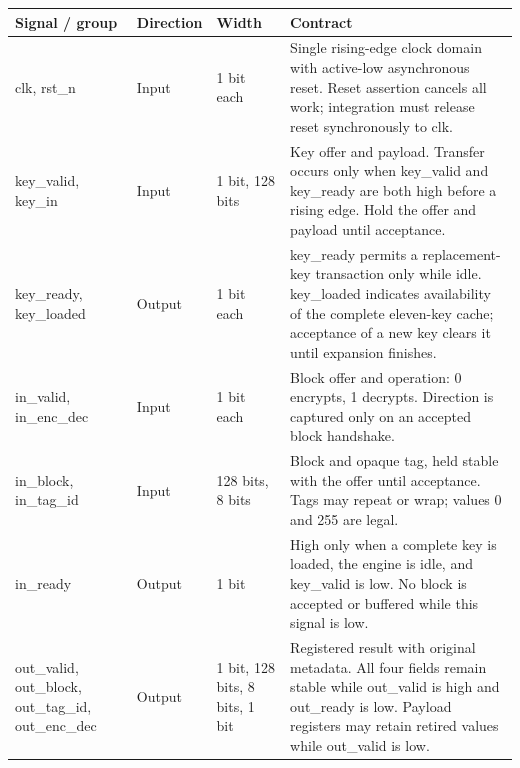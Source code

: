 \documentclass[11pt,a4paper]{article}
\begin{document}
{\small\renewcommand{\arraystretch}{1.18}\begin{longtable}{@{}L{0.21\textwidth}|L{0.12\textwidth}|L{0.12\textwidth}|L{0.45\textwidth}@{}}\toprule

\textbf{Signal /\allowbreak{} group} & \textbf{Direction} & \textbf{Width} & \textbf{Contract}\\\midrule\endhead

clk,\allowbreak{} rst\_\allowbreak{}n & Input & 1 bit each & Single rising-edge clock domain with active-low asynchronous reset. Reset assertion cancels all work; integration must release reset synchronously to clk.\\[2pt]\hline

key\_\allowbreak{}valid,\allowbreak{} key\_\allowbreak{}in & Input & 1 bit,\allowbreak{} 128 bits & Key offer and payload. Transfer occurs only when key\_\allowbreak{}valid and key\_\allowbreak{}ready are both high before a rising edge. Hold the offer and payload until acceptance.\\[2pt]\hline

key\_\allowbreak{}ready,\allowbreak{} key\_\allowbreak{}loaded & Output & 1 bit each & key\_\allowbreak{}ready permits a replacement-key transaction only while idle. key\_\allowbreak{}loaded indicates availability of the complete eleven-key cache; acceptance of a new key clears it until expansion finishes.\\[2pt]\hline

in\_\allowbreak{}valid,\allowbreak{} in\_\allowbreak{}enc\_\allowbreak{}dec & Input & 1 bit each & Block offer and operation: 0 encrypts,\allowbreak{} 1 decrypts. Direction is captured only on an accepted block handshake.\\[2pt]\hline

in\_\allowbreak{}block,\allowbreak{} in\_\allowbreak{}tag\_\allowbreak{}id & Input & 128 bits,\allowbreak{} 8 bits & Block and opaque tag,\allowbreak{} held stable with the offer until acceptance. Tags may repeat or wrap; values 0 and 255 are legal.\\[2pt]\hline

in\_\allowbreak{}ready & Output & 1 bit & High only when a complete key is loaded,\allowbreak{} the engine is idle,\allowbreak{} and key\_\allowbreak{}valid is low. No block is accepted or buffered while this signal is low.\\[2pt]\hline

out\_\allowbreak{}valid,\allowbreak{} out\_\allowbreak{}block,\allowbreak{} out\_\allowbreak{}tag\_\allowbreak{}id,\allowbreak{} out\_\allowbreak{}enc\_\allowbreak{}dec & Output & 1 bit,\allowbreak{} 128 bits,\allowbreak{} 8 bits,\allowbreak{} 1 bit & Registered result with original metadata. All four fields remain stable while out\_\allowbreak{}valid is high and out\_\allowbreak{}ready is low. Payload registers may retain retired values while out\_\allowbreak{}valid is low.\\[2pt]\hline


\end{longtable}}
\end{document}
